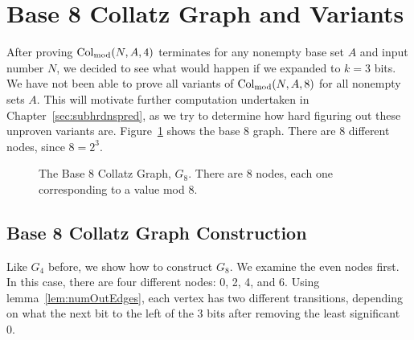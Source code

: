 \section{Base 8 Collatz Graph and Variants} \label{subsec:base8graphsubpblms}
After proving $\mathrm{Col}_{\text{mod}}(N,A,4)$ terminates for any nonempty base set $A$ and input number $N$, we decided to see what would happen if we expanded to $k = 3$ bits. We have not been able to prove all variants of $\mathrm{Col}_{\text{mod}}(N,A,8)$ for all nonempty sets $A$. This will motivate further computation undertaken in Chapter~\ref{sec:subhrdnspred}, as we try to determine how hard figuring out these unproven variants are. Figure~\ref{fig:base_8_graph} shows the base 8 graph. There are 8 different nodes, since $8 = 2^3$.
\begin{figure}
    \centering
    \caption{The Base 8 Collatz Graph, $G_8$. There are 8 nodes, each one corresponding to a value mod 8.}
    \label{fig:base_8_graph}
\end{figure}

\subsection{Base 8 Collatz Graph Construction} \label{subsubsec:base8proof}
Like $G_4$ before, we show how to construct $G_8$. We examine the even nodes first. In this case, there are four different nodes: 0, 2, 4, and 6. Using lemma~\ref{lem:numOutEdges}, each vertex has two different transitions, depending on what the next bit to the left of the 3 bits after removing the least significant 0. %


